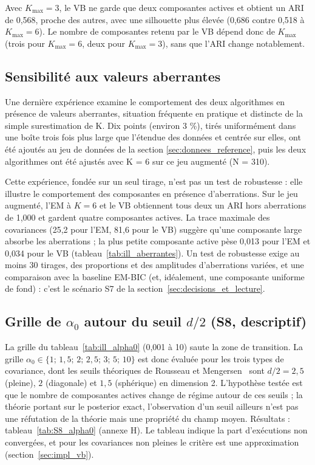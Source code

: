 Avec $K_{\max} = 3$, le VB ne garde que deux composantes actives et obtient un ARI de 0,568, proche des autres, avec une silhouette plus élevée (0,686 contre 0,518 à $K_{\max} = 6$). Le nombre de composantes retenu par le VB dépend donc de $K_{\max}$ (trois pour $K_{\max} = 6$, deux pour $K_{\max} = 3$), sans que l'ARI change notablement.

\subsection{Sensibilité aux valeurs aberrantes}\label{sec:res_aberrantes}
Une dernière expérience examine le comportement des deux algorithmes en présence de valeurs aberrantes, situation fréquente en pratique et distincte de la simple surestimation de K. Dix points (environ 3 \%), tirés uniformément dans une boîte trois fois plus large que l'étendue des données et centrée sur elles, ont été ajoutés au jeu de données de la section \ref{sec:donnees_reference}, puis les deux algorithmes ont été ajustés avec K = 6 sur ce jeu augmenté (N = 310).

Cette expérience, fondée sur un seul tirage, n'est pas un test de robustesse : elle illustre le comportement des composantes en présence d'aberrations. Sur le jeu augmenté, l'EM à $K=6$ et le VB obtiennent tous deux un ARI hors aberrations de 1,000 et gardent quatre composantes actives. La trace maximale des covariances (25,2 pour l'EM, 81,6 pour le VB) suggère qu'une composante large absorbe les aberrations ; la plus petite composante active pèse 0,013 pour l'EM et 0,034 pour le VB (tableau~\ref{tab:ill_aberrantes}). Un test de robustesse exige au moins 30 tirages, des proportions et des amplitudes d'aberrations variées, et une comparaison avec la baseline EM-BIC (et, idéalement, une composante uniforme de fond) : c'est le scénario S7 de la section~\ref{sec:decisions_et_lecture}.

\subsection{Grille de $\alpha_0$ autour du seuil $d/2$ (S8, descriptif)}\label{sec:res_s8}
La grille du tableau~\ref{tab:ill_alpha0} (0,001 à 10) saute la zone de transition. La grille $\alpha_0 \in \{1;\,1{,}5;\,2;\,2{,}5;\,3;\,5;\,10\}$ est donc évaluée pour les trois types de covariance, dont les seuils théoriques de Rousseau et Mengersen~\cite{rousseau2011} sont $d/2 = 2{,}5$ (pleine), $2$ (diagonale) et $1{,}5$ (sphérique) en dimension 2. L'hypothèse testée est que le nombre de composantes actives change de régime autour de ces seuils ; la théorie portant sur le posterior exact, l'observation d'un seuil ailleurs n'est pas une réfutation de la théorie mais une propriété du champ moyen. Résultats : tableau~\ref{tab:S8_alpha0} (annexe H). Le tableau indique la part d'exécutions non convergées, et pour les covariances non pleines le critère est une approximation (section~\ref{sec:impl_vb}).


